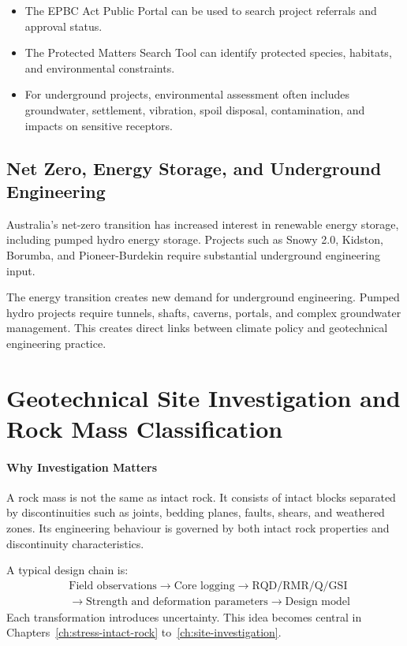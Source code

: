 \begin{itemize}
 \item The EPBC Act Public Portal can be used to search project referrals and approval status.
 \item The Protected Matters Search Tool can identify protected species, habitats, and environmental constraints.
 \item For underground projects, environmental assessment often includes groundwater, settlement, vibration, spoil disposal, contamination, and impacts on sensitive receptors.
\end{itemize}

\subsection{Net Zero, Energy Storage, and Underground Engineering}

Australia's net-zero transition has increased interest in renewable energy storage, including pumped hydro energy storage. Projects such as Snowy 2.0, Kidston, Borumba, and Pioneer-Burdekin require substantial underground engineering input.

\begin{keybox}
The energy transition creates new demand for underground engineering. Pumped hydro projects require tunnels, shafts, caverns, portals, and complex groundwater management. This creates direct links between climate policy and geotechnical engineering practice.
\end{keybox}

\section{Geotechnical Site Investigation and Rock Mass Classification}

\paragraph{Why Investigation Matters}
A rock mass is not the same as intact rock. It consists of intact blocks separated by discontinuities such as joints, bedding planes, faults, shears, and weathered zones. Its engineering behaviour is governed by both intact rock properties and discontinuity characteristics.

\begin{notebox}
A typical design chain is:
\[
\begin{aligned}
&\text{Field observations} \rightarrow \text{Core logging}
\rightarrow \text{RQD/RMR/Q/GSI} \\
&\rightarrow \text{Strength and deformation parameters}
\rightarrow \text{Design model}
\end{aligned}
\]
Each transformation introduces uncertainty. This idea becomes central in Chapters~\ref{ch:stress-intact-rock} to~\ref{ch:site-investigation}.
\end{notebox}

